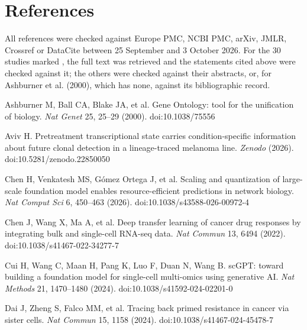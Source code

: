 \documentclass[11pt,a4paper]{article}
\begin{document}
\section*{References}

\noindent All references were checked against Europe PMC, NCBI PMC, arXiv, JMLR, Crossref or DataCite between 25 September and 3 October 2026. For the 30 studies marked , the full text was retrieved and the statements cited above were checked against it; the others were checked against their abstracts, or, for Ashburner et al. (2000), which has none, against its bibliographic record.\par\vspace{2pt}

\noindent Ashburner M, Ball CA, Blake JA, et al. Gene Ontology: tool for the unification of biology. \emph{Nat Genet} 25, 25--29 (2000). doi:10.1038/75556\par\vspace{2pt}

\noindent Aviv H. Pretreatment transcriptional state carries condition-specific information about future clonal detection in a lineage-traced melanoma line. \emph{Zenodo} (2026). doi:10.5281/zenodo.22850050 \par\vspace{2pt}

\noindent Chen H, Venkatesh MS, G\'omez Ortega J, et al. Scaling and quantization of large-scale foundation model enables resource-efficient predictions in network biology. \emph{Nat Comput Sci} 6, 450--463 (2026). doi:10.1038/s43588-026-00972-4\par\vspace{2pt}

\noindent Chen J, Wang X, Ma A, et al. Deep transfer learning of cancer drug responses by integrating bulk and single-cell RNA-seq data. \emph{Nat Commun} 13, 6494 (2022). doi:10.1038/s41467-022-34277-7 \par\vspace{2pt}

\noindent Cui H, Wang C, Maan H, Pang K, Luo F, Duan N, Wang B. scGPT: toward building a foundation model for single-cell multi-omics using generative AI. \emph{Nat Methods} 21, 1470--1480 (2024). doi:10.1038/s41592-024-02201-0\par\vspace{2pt}

\noindent Dai J, Zheng S, Falco MM, et al. Tracing back primed resistance in cancer via sister cells. \emph{Nat Commun} 15, 1158 (2024). doi:10.1038/s41467-024-45478-7 \par\vspace{2pt}
\end{document}
